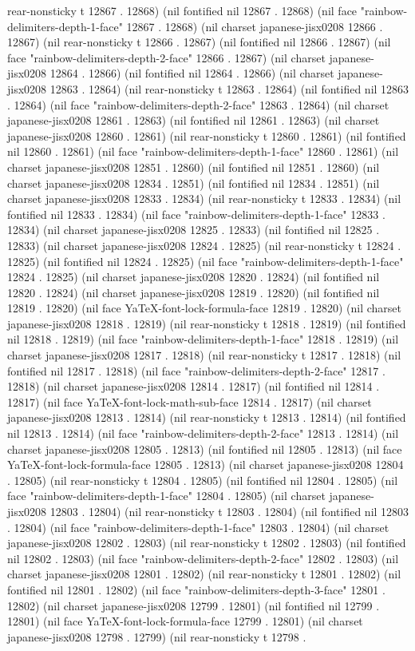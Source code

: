 rear-nonsticky t 12867 . 12868) (nil fontified nil 12867 . 12868) (nil face "rainbow-delimiters-depth-1-face" 12867 . 12868) (nil charset japanese-jisx0208 12866 . 12867) (nil rear-nonsticky t 12866 . 12867) (nil fontified nil 12866 . 12867) (nil face "rainbow-delimiters-depth-2-face" 12866 . 12867) (nil charset japanese-jisx0208 12864 . 12866) (nil fontified nil 12864 . 12866) (nil charset japanese-jisx0208 12863 . 12864) (nil rear-nonsticky t 12863 . 12864) (nil fontified nil 12863 . 12864) (nil face "rainbow-delimiters-depth-2-face" 12863 . 12864) (nil charset japanese-jisx0208 12861 . 12863) (nil fontified nil 12861 . 12863) (nil charset japanese-jisx0208 12860 . 12861) (nil rear-nonsticky t 12860 . 12861) (nil fontified nil 12860 . 12861) (nil face "rainbow-delimiters-depth-1-face" 12860 . 12861) (nil charset japanese-jisx0208 12851 . 12860) (nil fontified nil 12851 . 12860) (nil charset japanese-jisx0208 12834 . 12851) (nil fontified nil 12834 . 12851) (nil charset japanese-jisx0208 12833 . 12834) (nil rear-nonsticky t 12833 . 12834) (nil fontified nil 12833 . 12834) (nil face "rainbow-delimiters-depth-1-face" 12833 . 12834) (nil charset japanese-jisx0208 12825 . 12833) (nil fontified nil 12825 . 12833) (nil charset japanese-jisx0208 12824 . 12825) (nil rear-nonsticky t 12824 . 12825) (nil fontified nil 12824 . 12825) (nil face "rainbow-delimiters-depth-1-face" 12824 . 12825) (nil charset japanese-jisx0208 12820 . 12824) (nil fontified nil 12820 . 12824) (nil charset japanese-jisx0208 12819 . 12820) (nil fontified nil 12819 . 12820) (nil face YaTeX-font-lock-formula-face 12819 . 12820) (nil charset japanese-jisx0208 12818 . 12819) (nil rear-nonsticky t 12818 . 12819) (nil fontified nil 12818 . 12819) (nil face "rainbow-delimiters-depth-1-face" 12818 . 12819) (nil charset japanese-jisx0208 12817 . 12818) (nil rear-nonsticky t 12817 . 12818) (nil fontified nil 12817 . 12818) (nil face "rainbow-delimiters-depth-2-face" 12817 . 12818) (nil charset japanese-jisx0208 12814 . 12817) (nil fontified nil 12814 . 12817) (nil face YaTeX-font-lock-math-sub-face 12814 . 12817) (nil charset japanese-jisx0208 12813 . 12814) (nil rear-nonsticky t 12813 . 12814) (nil fontified nil 12813 . 12814) (nil face "rainbow-delimiters-depth-2-face" 12813 . 12814) (nil charset japanese-jisx0208 12805 . 12813) (nil fontified nil 12805 . 12813) (nil face YaTeX-font-lock-formula-face 12805 . 12813) (nil charset japanese-jisx0208 12804 . 12805) (nil rear-nonsticky t 12804 . 12805) (nil fontified nil 12804 . 12805) (nil face "rainbow-delimiters-depth-1-face" 12804 . 12805) (nil charset japanese-jisx0208 12803 . 12804) (nil rear-nonsticky t 12803 . 12804) (nil fontified nil 12803 . 12804) (nil face "rainbow-delimiters-depth-1-face" 12803 . 12804) (nil charset japanese-jisx0208 12802 . 12803) (nil rear-nonsticky t 12802 . 12803) (nil fontified nil 12802 . 12803) (nil face "rainbow-delimiters-depth-2-face" 12802 . 12803) (nil charset japanese-jisx0208 12801 . 12802) (nil rear-nonsticky t 12801 . 12802) (nil fontified nil 12801 . 12802) (nil face "rainbow-delimiters-depth-3-face" 12801 . 12802) (nil charset japanese-jisx0208 12799 . 12801) (nil fontified nil 12799 . 12801) (nil face YaTeX-font-lock-formula-face 12799 . 12801) (nil charset japanese-jisx0208 12798 . 12799) (nil rear-nonsticky t 12798 . 